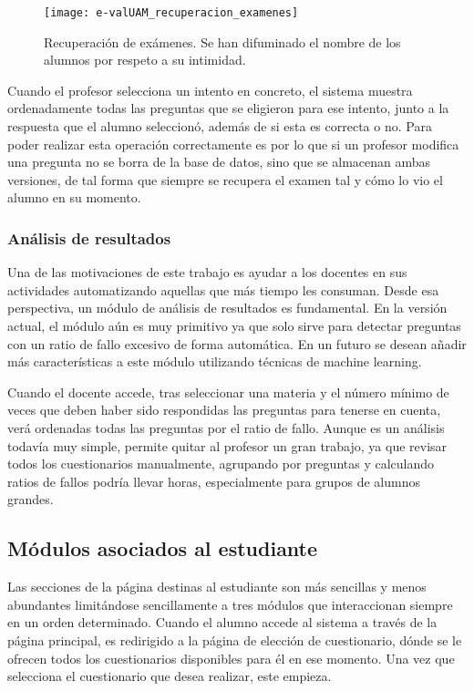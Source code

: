 \begin{figure}[htp!]
	\centering
	\texttt{[image: e-valUAM\_recuperacion\_examenes]}
	\caption[Recuperación de exámenes]{Recuperación de exámenes. Se han difuminado el nombre de los alumnos por respeto a su intimidad.}
	\label{fig:e-valUAM recuperacion examenes profesor}
\end{figure}

Cuando el profesor selecciona un intento en concreto, el sistema muestra ordenadamente todas las preguntas que se eligieron para ese intento, junto a la respuesta que el alumno seleccionó, además de si esta es correcta o no. Para poder realizar esta operación correctamente es por lo que si un profesor modifica una pregunta no se borra de la base de datos, sino que se almacenan ambas versiones, de tal forma que siempre se recupera el examen tal y cómo lo vio el alumno en su momento.

\subsubsection{Análisis de resultados}

Una de las motivaciones de este trabajo es ayudar a los docentes en sus actividades automatizando aquellas que más tiempo les consuman. Desde esa perspectiva, un módulo de análisis de resultados es fundamental. En la versión actual, el módulo aún es muy primitivo ya que solo sirve para detectar preguntas con un ratio de fallo excesivo de forma automática. En un futuro se desean añadir más características a este módulo utilizando técnicas de machine learning.

Cuando el docente accede, tras seleccionar una materia y el número mínimo de veces que deben haber sido respondidas las preguntas para tenerse en cuenta, verá ordenadas todas las preguntas por el ratio de fallo. Aunque es un análisis todavía muy simple, permite quitar al profesor un gran trabajo, ya que revisar todos los cuestionarios manualmente, agrupando por preguntas y calculando ratios de fallos podría llevar horas, especialmente para grupos de alumnos grandes.

\subsection{Módulos asociados al estudiante}

Las secciones de la página destinas al estudiante son más sencillas y menos abundantes limitándose sencillamente a tres módulos que interaccionan siempre en un orden determinado. Cuando el alumno accede al sistema a través de la página principal, es redirigido a la página de elección de cuestionario, dónde se le ofrecen todos los cuestionarios disponibles para él en ese momento. Una vez que selecciona el cuestionario que desea realizar, este empieza.

